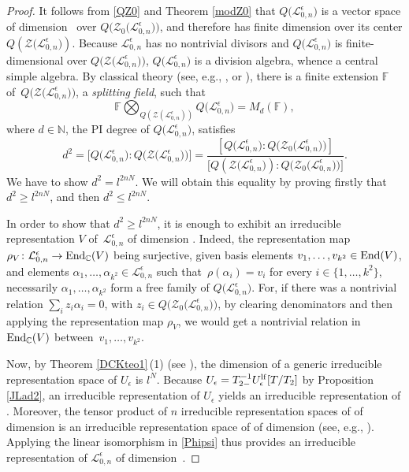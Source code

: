 \documentclass[10pt,a4paper]{amsart}
\numberwithin{equation}{section}
\theoremstyle{definition}
\newcommand{\e}{\epsilon}
\newcommand{\mc}{\mathbb{C}}
\newcommand{\Ll}{{\mathcal L}}
\newcommand{\ra}{\rightarrow}
\begin{document}
\begin{proof} It follows from \eqref{QZ0} and Theorem \ref{modZ0} that $Q\bigl(\Ll_{0,n}^\e\bigr)$ is a vector space of dimension~ over $Q\bigl(\mathcal{Z}_0\bigl(\Ll_{0,n}^\e\bigr)\bigr)$, and therefore has finite dimension over its center $Q(\mathcal{Z}\bigl(\Ll_{0,n}^\e\bigr))$. Because $\Ll_{0,n}^\e$ has no nontrivial divisors \cite[Proposition 6.30]{BR} and $Q\bigl(\Ll_{0,n}^\e\bigr)$ is finite-dimensional over $Q\bigl(\mathcal{Z}\bigl(\Ll_{0,n}^\e\bigr)\bigr)$, $Q\bigl(\Ll_{0,n}^\e\bigr)$ is a division algebra, whence a central simple algebra. By classical theory (see, e.g., \cite[Section~13.3.5]{MC-R}, or \cite[Corollary~2.3.25]{Rowen}), there is a finite extension $\mathbb{F}$ of~$Q\bigl(\mathcal{Z}\bigl(\Ll_{0,n}^\e\bigr)\bigr)$, a {\it splitting field}, such that
\[\mathbb{F} \bigotimes_{Q(\mathcal{Z}(\Ll_{0,n}^\e))} Q\bigl(\Ll_{0,n}^\e\bigr) = M_{d}(\mathbb{F}),\]
where $d\in \mathbb{N}$, the PI degree of $Q\bigl(\Ll_{0,n}^\e\bigr)$, satisfies
\begin{equation}\label{factdegree}
d^2 = \bigl[Q\bigl(\Ll_{0,n}^\e\bigr):Q\bigl(\mathcal{Z}\bigl(\Ll_{0,n}^\e\bigr)\bigr)\bigr] = \frac{[Q\bigl(\Ll_{0,n}^\e\bigr):Q\bigl(\mathcal{Z}_0\bigl(\Ll_{0,n}^\e\bigr)\bigr)]}{\bigl[Q(\mathcal{Z}\bigl(\Ll_{0,n}^\e\bigr)): Q\bigl(\mathcal{Z}_0\bigl(\Ll_{0,n}^\e\bigr)\bigr)\bigr]}.
\end{equation}
We have to show $d^2=l^{2nN}$. We will obtain this equality by proving firstly that $d^2\geq l^{2nN}$, and then $d^2\leq l^{2nN}$.

In order to show that $d^2\geq l^{2nN}$, it is enough to exhibit an irreducible representation $V$ of~$\Ll_{0,n}^\e$ of dimension . Indeed, the representation map $\rho_V\colon \Ll_{0,n}^\e\ra {\rm End}_{\mc}(V)$ being surjective, given basis elements $v_1,\dots, v_{k^2}\in {\rm End}(V)$, and elements $\alpha_1,\dots,\alpha_{k^2}\in \Ll_{0,n}^\e$ such that~${\rho(\alpha_i) = v_i}$ for every $i\in \bigl\{1,\dots,k^2\bigr\}$, necessarily $\alpha_1,\dots,\alpha_{k^2}$ form a free family of $Q\bigl(\Ll_{0,n}^\e\bigr)$. For, if there was a nontrivial relation $ \sum_i z_i\alpha_i=0$, with $z_i\in Q\bigl(\mathcal{Z}_0\bigl(\Ll_{0,n}^\e\bigr)\bigr)$, by clearing denominators and then applying the representation map $\rho_V$, we would get a nontrivial relation in~${\rm End}_{\mc}(V)$ between~${v_1,\dots, v_{k^2}}$.

Now, by Theorem \ref{DCKteo1}\,(1) (see \cite[Section 20]{DC-K-P2}), the dimension of a generic irreducible representation space of $U_\e$ is $l^N$. Because $U_\e = T_{2-}^{-1}U_\e^{\rm lf}[T/T_{2}]$ by Proposition \ref{JLad2}, an irreducible representation of $U_\e$ yields an irreducible representation of \smash{$U_\e^{\rm lf}$}. Moreover, the tensor product of $n$ irreducible representation spaces of \smash{$U_\e^{\rm lf}$} of dimension  is an irreducible representation space of \smash{$\big(U_\e^{\rm lf}\big)^{\otimes n}$} of dimension  (see, e.g., \cite[Theorem 3.10.2]{Et}). Applying the linear isomorphism  in \eqref{Phipsi} thus provides an irreducible representation of $\Ll_{0,n}^\e$ of dimension~.


\end{proof}
\end{document}

